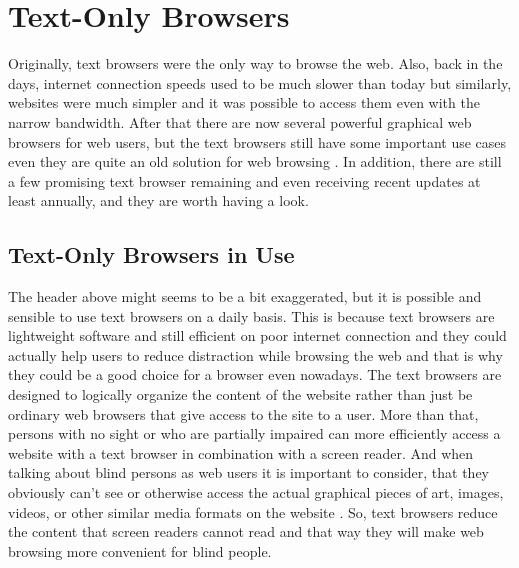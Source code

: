 %
%
% 
% 


\chapter{Text-Only Browsers}%
\label{ch:tb}

Originally, text browsers were the only way to browse the web. Also,
back in the days, internet connection speeds used to be much slower
than today but similarly, websites were much simpler and it was
possible to access them even with the narrow bandwidth. After
that there are now several powerful graphical web browsers for web
users, but the text browsers still have some important use cases even
they are quite an old solution for web browsing
\parencite{best-text-browsers}. In addition, there are still a few
promising text browser remaining and even receiving recent updates at
least annually, and they are worth having a look.


\section{Text-Only Browsers in Use}%
\label{sec:tb-known}

The header above might seems to be a bit exaggerated, but it is
possible and sensible to use text browsers on a daily
basis. This is because text browsers are lightweight software and
still efficient on poor internet connection and they could actually
help users to reduce distraction while browsing the web and that is why
they could be a good choice for a browser even nowadays. The text
browsers are designed to logically organize the content of the website
rather than just be ordinary web browsers that give access to
the site to a user. More than that, persons with no sight or who are
partially impaired can more efficiently access a website with a text
browser in combination with a screen reader. And when talking about
blind persons as web users it is important to consider, that they
obviously can't see or otherwise access the actual graphical pieces of
art, images, videos, or other similar media formats on the
website \parencite[Chapter 2]{webbie}. So, text browsers reduce the
content that screen readers cannot read and that way they will make
web browsing more convenient for blind people.


